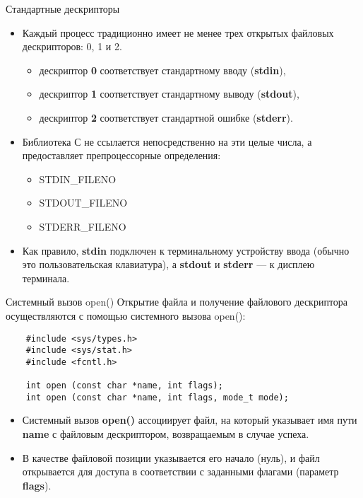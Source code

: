 \documentclass[xcolor=table]{beamer}
\begin{document}
\begin{frame}{Стандартные дескрипторы}
\begin{itemize}
\item Каждый процесс традиционно имеет не менее трех открытых файловых дескрипторов: 0, 1 и 2. 
	\begin{itemize}
	\item дескриптор \textbf{0} соответствует стандартному вводу (\textbf{stdin}), 
	\item дескриптор \textbf{1} соответствует стандартному выводу (\textbf{stdout}), 
	\item дескриптор \textbf{2} соответствует стандартной ошибке (\textbf{stderr}).
	\end{itemize}

\item Библиотека С не ссылается непосредственно на эти целые числа, а предоставляет препроцессорные определения:
	\begin{itemize}
	\item STDIN\_FILENO 
	\item STDOUT\_FILENO 
	\item STDERR\_FILENO
	\end{itemize} 
\item Как правило, \textbf{stdin} подключен к терминальному устройству ввода (обычно это пользовательская клавиатура), а \textbf{stdout} и \textbf{stderr} — к дисплею терминала. 
\end{itemize}
\end{frame}

\begin{frame}[fragile]{Системный вызов open()}
	Открытие файла и получение файлового дескриптора осуществляются с помощью системного вызова open():
	\begin{verbatim}
	#include <sys/types.h>
	#include <sys/stat.h>        
	#include <fcntl.h>                

	int open (const char *name, int flags);
	int open (const char *name, int flags, mode_t mode);		
	\end{verbatim}  
	\begin{itemize}
	\item Системный вызов \textbf{open()} ассоциирует файл, на который указывает имя пути \textbf{name} с файловым дескриптором, возвращаемым в случае успеха.
	\item В качестве файловой  позиции указывается его начало (нуль), и файл открывается для доступа в соответствии с заданными флагами (параметр \textbf{flags}).
	\end{itemize}	  
\end{frame}
\end{document}

